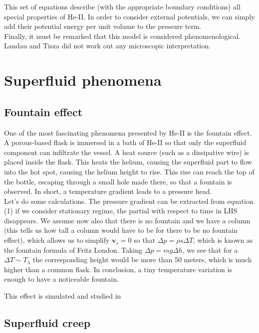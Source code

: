 \documentclass{article}
\begin{document}
This set of equations describe (with the appropriate boundary conditions) all special properties of He-II\@. In order to consider external potentials, we can simply add their potential energy per unit volume to the pressure term. 
\\

Finally, it must be remarked that this model is considered phenomenological. Landau and Tisza did not work out any microscopic interpretation. 

\section{Superfluid phenomena}

\subsection{Fountain effect}


One of the most fascinating phenomena presented by He-II is the fountain effect. A porous-based flask is immersed in a bath of He-II so that only the superfluid component can infiltrate the vessel. A heat source (such as a dissipative wire) is placed inside the flask. This heats the helium, causing the superfluid part to flow into the hot spot, causing the helium height to rise. This rise can reach the top of the bottle, escaping through a small hole made there, so that a fountain is observed. In short, a temperature gradient leads to a pressure head.
\\

Let's do some calculations. The pressure gradient can be extracted from equation (1) if we consider stationary regime, the partial with respect to time in LHS disappears. We assume now also that there is no fountain and we have a column (this tells us how tall a column would have to be for there to be no fountain effect), which allows us to simplify $\mathbf{v}_s = 0$ so that $\Delta p = \rho s \Delta T$, which is known as the fountain formula of Fritz London. Taking $\Delta p = mg \Delta h$, we see that for a $\Delta T \sim T_\lambda$ the corresponding height would be more than 50 meters, which is much higher than a common flask. In conclusion, a tiny temperature variation is enough to have a noticeable fountain.

This effect is simulated and studied in \cite{Kincl}

\subsection{Superfluid creep}
\end{document}
